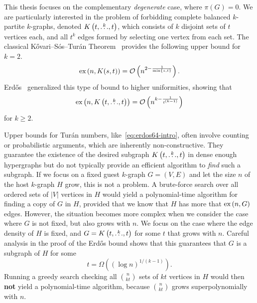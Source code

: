 This thesis focuses on the complementary \emph{degenerate} case, where $\pi(G) = 0$.
We are particularly interested in the problem of forbidding complete balanced $k$-partite $k$-graphs,
denoted $K\left(t, \overset{k}{\dots}, t\right)$, which consists of $k$ disjoint sets of $t$ vertices each,
and all $t^k$ edges formed by selecting one vertex from each set.
The classical Kővari--Sós--Turán Theorem~\cite{Kovari1954, Hylten1958}
provides the following upper bound for $k=2$.
\[
    \text{ex} \left( n, K(s, t) \right) = \mathcal{O}\left(n^{2 - \frac{1}{\min\{s, t\}}}\right).
\]
Erdős~\cite{Erods1964} generalized this type of bound to higher uniformities,
showing that
\begin{equation} \label{eq:erdos64-intro}
    \text{ex} \left( n, K\left(t, \overset{k}{\dots}, t\right) \right) = \mathcal{O}\left(n^{k - \frac{1}{t^{(k-1)}}}\right)
\end{equation}
for $k \ge 2$.

Upper bounds for Turán numbers, like~\eqref{eq:erdos64-intro},
often involve counting or probabilistic arguments,
which are inherently non-constructive.
They guarantee the existence of the desired subgraph $K\left(t, \overset{k}{\dots}, t\right)$
in dense enough hypergraphs but do not typically provide an efficient algorithm to \emph{find} such a subgraph.
If we focus on a fixed guest $k$-graph $G = (V, E)$ and let the size $n$ of the host $k$-graph $H$ grow,
this is not a problem.
A brute-force search over all ordered sets of $|V|$ vertices in $H$ would yield a polynomial-time algorithm
for finding a copy of $G$ in $H$, provided that we know that $H$ has more that $\text{ex} \left( n, G \right)$ edges.
However, the situation becomes more complex when we consider the case where $G$ is not fixed, but also grows with $n$.
We focus on the case where the edge density of $H$ is fixed, and $G = K\left(t, \overset{k}{\dots}, t\right)$ for some $t$ that grows with $n$.
Careful analysis in the proof of the Erdős bound shows that this guarantees that $G$ is a subgraph of $H$ for some
\begin{equation} \label{eq:t-lower-intro}
    t = \Omega\left( (\log n)^{1/(k-1) }\right).
\end{equation}
Running a greedy search checking all $\binom{n}{kt}$ sets of $kt$
vertices in $H$ would then \textbf{not} yield a polynomial-time algorithm,
because $\binom{n}{kt}$ grows superpolynomially with $n$.

